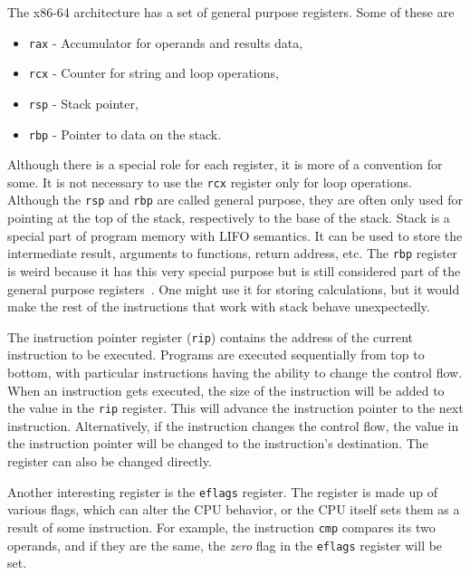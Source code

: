 The x86-64 architecture has a set of general purpose registers.
Some of these are
\begin{itemize}
    \item \texttt{rax} - Accumulator for operands and results data,
    \item \texttt{rcx} - Counter for string and loop operations,
    \item \texttt{rsp} - Stack pointer,
    \item \texttt{rbp} - Pointer to data on the stack.
\end{itemize}
Although there is a special role for each register, it is more of a convention
for some. It is not necessary to use the \texttt{rcx} register only for loop
operations. Although the \texttt{rsp} and \texttt{rbp} are called general
purpose, they are often only used for pointing at the top of the stack,
respectively to the base of the stack. Stack is a special part of program
memory with LIFO semantics. It can be used to store the intermediate result,
arguments to functions, return address, etc. The \texttt{rbp} register is weird
because it has this very special purpose but is still considered part of the
general purpose registers~\cite{intel-manual}. One might use it for storing
calculations, but it would make the rest of the instructions that work with
stack behave unexpectedly.

The instruction pointer register (\texttt{rip}) contains the address of the
current instruction to be executed. Programs are executed sequentially from top
to bottom, with particular instructions having the ability to change the
control flow. When an instruction gets executed, the size of the instruction
will be added to the value in the \texttt{rip} register. This will advance the
instruction pointer to the next instruction. Alternatively, if the instruction
changes the control flow, the value in the instruction pointer will be changed
to the instruction's destination. The register can also be changed directly.

Another interesting register is the \texttt{eflags} register. The register is
made up of various flags, which can alter the CPU behavior, or the CPU itself
sets them as a result of some instruction. For example, the instruction
\texttt{cmp} compares its two operands, and if they are the same, the
\textit{zero} flag in the \texttt{eflags} register will be set.

